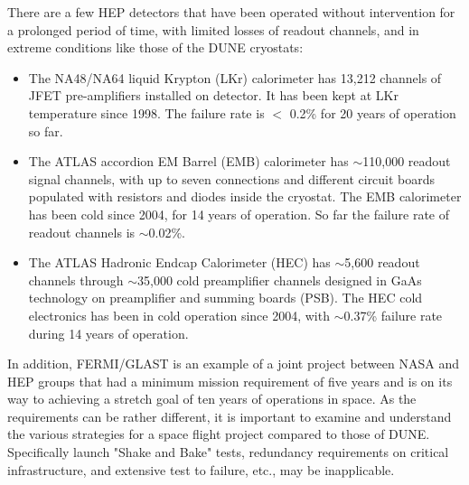 There are a few HEP detectors that have been operated without intervention for a 
prolonged period of time, with limited losses of readout channels, and in extreme 
conditions like those of the DUNE cryostats:
\begin{itemize}
	\item The NA48/NA64 liquid Krypton (LKr) calorimeter has 13,212 channels 
	of JFET pre-amplifiers installed on detector. It has been kept at LKr temperature 
	since 1998. The failure rate is $<$ 0.2\% for 20 years of operation so far.
	\item The ATLAS  accordion EM Barrel (EMB) calorimeter has 
	$\sim$110,000 readout signal channels, with up to seven connections and different 
	circuit boards populated with resistors and diodes inside the cryostat. The EMB
        calorimeter has been cold since 2004, for 14 years of operation.  So far the
        failure rate of readout channels is $\sim$0.02\%.
	\item The ATLAS  Hadronic Endcap Calorimeter (HEC) has $\sim$5,600 
	readout channels through $\sim$35,000 cold preamplifier channels designed in GaAs 
        technology on preamplifier and summing boards (PSB). The HEC cold electronics has 
	been in cold operation since 2004, with $\sim$0.37\% failure rate during 14 years of operation. 
\end{itemize}
In addition, FERMI/GLAST is an example of a joint project between NASA and HEP groups 
that had a minimum mission requirement of five years and is on its way to achieving a 
stretch goal of ten years of operations in space. As the requirements can be rather 
different, it is important to examine and understand the various strategies for a space 
flight project compared to those of DUNE. Specifically launch "Shake and Bake" tests, 
redundancy requirements on critical infrastructure, and extensive test to failure, etc., 
may be inapplicable.

